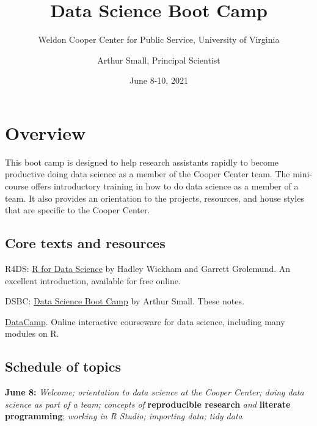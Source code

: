 \documentclass[
]{book}
\title{Data Science Boot Camp}
\subtitle{Weldon Cooper Center for Public Service, University of Virginia}
\author{Arthur Small, Principal Scientist}
\date{June 8-10, 2021}
\begin{document}
\maketitle

{
\setcounter{tocdepth}{1}
\tableofcontents
}
\hypertarget{overview}{%
\chapter{Overview}\label{overview}}

This boot camp is designed to help research assistants rapidly to become productive doing data science as a member of the Cooper Center team. The mini-course offers introductory training in how to do data science as a member of a team. It also provides an orientation to the projects, resources, and house styles that are specific to the Cooper Center.

\hypertarget{core-texts-and-resources}{%
\section{Core texts and resources}\label{core-texts-and-resources}}

R4DS: \href{https://r4ds.had.co.nz/}{R for Data Science} by Hadley Wickham and Garrett Grolemund. An excellent introduction, available for free online.

DSBC: \href{https://bookdown.org/arthursmalliii/boot-camp/}{Data Science Boot Camp} by Arthur Small. These notes.

\href{https://www.datacamp.com/groups/shared_links/204e9d252e533227deb1caf2ce99e30b6df1f98c45a978824364bda2a6bc00ef}{DataCamp}. Online interactive courseware for data science, including many modules on R.

\hypertarget{schedule-of-topics}{%
\section{Schedule of topics}\label{schedule-of-topics}}

\textbf{June 8:} \emph{Welcome; orientation to data science at the Cooper Center; doing data science as part of a team; concepts of} \textbf{reproducible research} \emph{and} \textbf{literate programming}; \emph{working in R Studio; importing data; tidy data}
\end{document}
